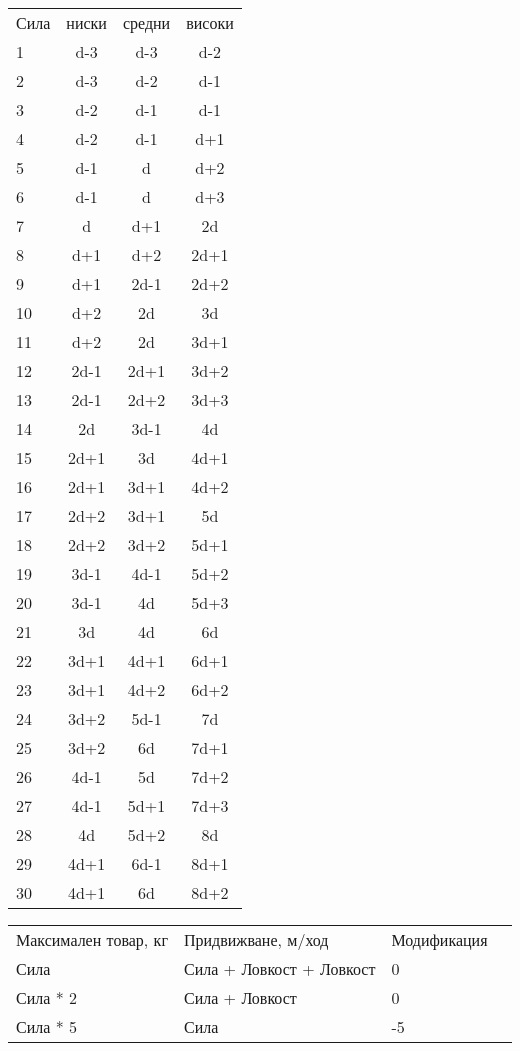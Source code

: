 \documentclass{article}
\begin{document}
\begin{multicols}{2}
\begin{footnotesize}
\extrarowsep=0cm
\noindent
{}
\begin{tabular}[b]{l | c | c | c}
Сила    & ниски & средни & високи  \\
1  & d-3  & d-3  & d-2   \\
2  & d-3  & d-2  & d-1   \\
3  & d-2  & d-1  & d-1   \\
4  & d-2  & d-1  & d+1   \\
5  & d-1  & d    & d+2   \\
6  & d-1  & d    & d+3   \\
7  & d    & d+1  & 2d    \\
8  & d+1  & d+2  & 2d+1  \\
9  & d+1  & 2d-1 & 2d+2  \\
10 & d+2  & 2d   & 3d    \\
11 & d+2  & 2d   & 3d+1  \\
12 & 2d-1 & 2d+1 & 3d+2  \\
13 & 2d-1 & 2d+2 & 3d+3  \\
14 & 2d   & 3d-1 & 4d    \\
15 & 2d+1 & 3d   & 4d+1  \\
16 & 2d+1 & 3d+1 & 4d+2  \\
17 & 2d+2 & 3d+1 & 5d    \\
18 & 2d+2 & 3d+2 & 5d+1  \\
19 & 3d-1 & 4d-1 & 5d+2  \\
20 & 3d-1 & 4d   & 5d+3  \\
21 & 3d   & 4d   & 6d    \\
22 & 3d+1 & 4d+1 & 6d+1  \\
23 & 3d+1 & 4d+2 & 6d+2  \\
24 & 3d+2 & 5d-1 & 7d    \\
25 & 3d+2 & 6d   & 7d+1  \\
26 & 4d-1 & 5d   & 7d+2  \\
27 & 4d-1 & 5d+1 & 7d+3  \\
28 & 4d   & 5d+2 & 8d    \\
29 & 4d+1 & 6d-1 & 8d+1  \\
30 & 4d+1 & 6d   & 8d+2
\end{tabular}

\vspace{0.3cm}
\noindent
{}
\begin{tabular}[b]{l | l | l | l }
Максимален товар, кг & Придвижване, м/ход       & Модификация  \\
Сила                 & Сила + Ловкост + Ловкост & 0            \\
Сила * 2             & Сила + Ловкост           & 0            \\
Сила * 5             & Сила                     & -5
\end{tabular}
\end{footnotesize}
\end{multicols}
\end{document}
